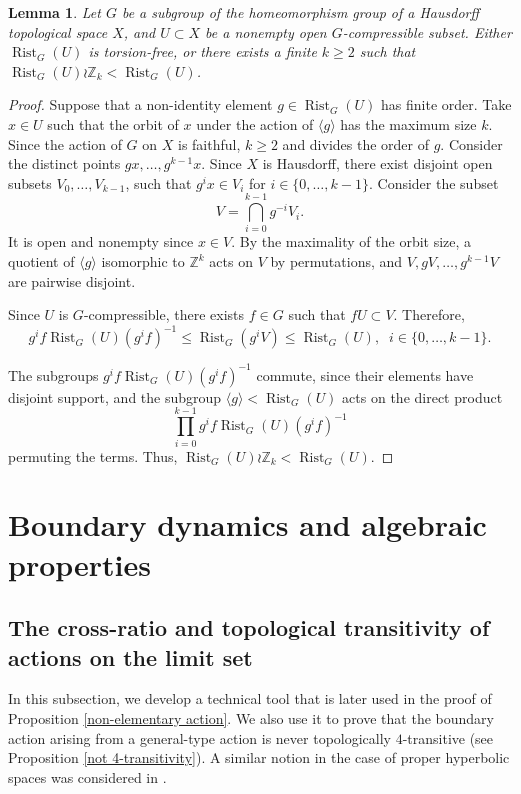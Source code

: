 \documentclass[11pt,letterpaper]{article}
\newcommand{\ZZ}{\mathbb{Z}}
\renewcommand{\l}{\langle}
\renewcommand{\r}{\rangle}
\DeclareMathOperator{\rist}{Rist}
\newtheorem{lem}[thm]{Lemma}
\theoremstyle{definition}
\theoremstyle{remark}
\begin{document}
\begin{lem}\label{wreath products in rigid stabilizers}
Let $G$ be a subgroup of the homeomorphism group of a Hausdorff topological space $X$, and $U \subset X$ be a nonempty open $G$-compressible subset. Either $\rist_G(U)$ is torsion-free, or there exists a finite $k \geq 2$ such that 
$\rist_G(U) \wr \ZZ_k < \rist_G(U)$.  
\end{lem}
\begin{proof}
Suppose that a non-identity element $g \in \rist_G(U)$ has finite order. Take $x \in U$ such that the orbit of $x$ under the action of $\l g \r$ has the maximum size $k$. Since the action of $G$ on $X$ is faithful, $k \geq 2$ and divides the order of $g$. Consider the distinct points $gx, \dots, g^{k-1}x$. Since $X$ is Hausdorff, there exist disjoint open subsets $V_0, \dots, V_{k-1}$, such that $g^ix \in V_i$ for $i \in \{0, \dots, k-1\}$. Consider the subset 
$$
V=\bigcap_{i=0}^{k-1} g^{-i}V_i.
$$
It is open and nonempty since $x \in V$. By the maximality of the orbit size, a quotient of $\l g \r$ isomorphic to $\ZZ^k$ acts on $V$ by permutations, and $V, gV, \dots, g^{k-1}V$ are pairwise disjoint. 

Since $U$ is $G$-compressible, there exists $f \in G$ such that $fU \subset V$. Therefore, 
$$
g^if\rist_G(U)(g^if)^{-1} \leq \rist_G(g^iV) \leq \rist_G(U), \; \; i \in \{0, \dots, k-1\}.
$$ 

The subgroups $g^if\rist_G(U)(g^if)^{-1}$ commute, since their elements have disjoint support, and the subgroup $\l g \r < \rist_G(U)$ acts on the direct product 
$$
\prod_{i=0}^{k-1}g^if\rist_G(U)(g^if)^{-1}
$$
permuting the terms.
Thus, $\rist_G(U) \wr \ZZ_k < \rist_G(U)$.
\end{proof}

\section{Boundary dynamics and algebraic properties}

\subsection{The cross-ratio and topological transitivity of actions on the limit set}

In this subsection, we develop a technical tool that is later used in the proof of Proposition \ref{non-elementary action}. We also use it to prove that the boundary action arising from a general-type action is never topologically $4$-transitive (see Proposition \ref{not 4-transitivity}). A similar notion in the case of proper hyperbolic spaces was considered in \cite{Paul}.
\end{document}

